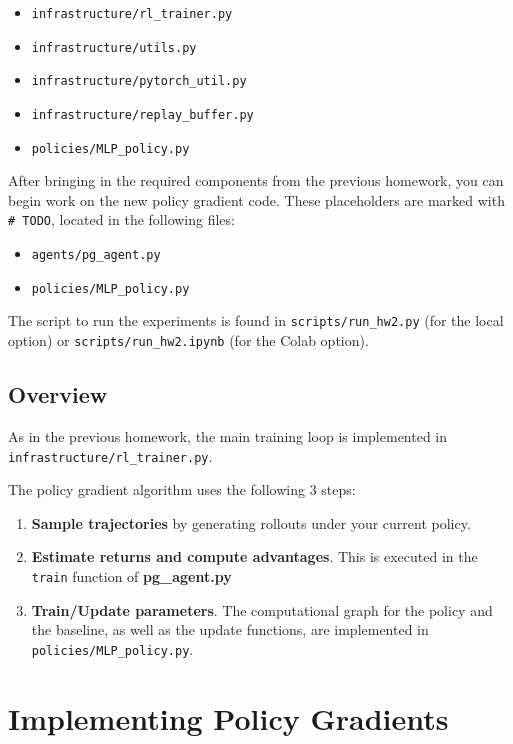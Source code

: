 \documentclass{article}
\begin{document}
\begin{itemize}
\item \texttt{infrastructure/rl\_trainer.py}
\item \texttt{infrastructure/utils.py}
\item \texttt{infrastructure/pytorch\_util.py}
\item \texttt{infrastructure/replay\_buffer.py}
\item \texttt{policies/MLP\_policy.py}
\end{itemize}

After bringing in the required components from the previous homework, you can begin work on the new policy gradient code. These placeholders are marked with \texttt{\#~TODO}, located in the following files:
\begin{itemize}
\item \texttt{agents/pg\_agent.py}
\item \texttt{policies/MLP\_policy.py}
\end{itemize}

The script to run the experiments is found in \texttt{scripts/run\_hw2.py} (for the local option) or \texttt{scripts/run\_hw2.ipynb} (for the Colab option).


\subsection{Overview}

As in the previous homework, the main training loop is implemented in \newline \texttt{infrastructure/rl\_trainer.py}.

The policy gradient algorithm uses the following 3 steps:
\begin{enumerate}
    \item \textbf{Sample trajectories} by generating rollouts under your current policy.
    \item \textbf{Estimate returns and compute advantages}. This is executed in the \texttt{train} function of \textbf{pg\_agent.py}
    \item \textbf{Train/Update parameters}. The computational graph for the policy and the baseline, as well as the update functions, are implemented in \texttt{policies/MLP\_policy.py}.
\end{enumerate}

\section{Implementing Policy Gradients}
\label{sec:vanilla_pg}
\end{document}
